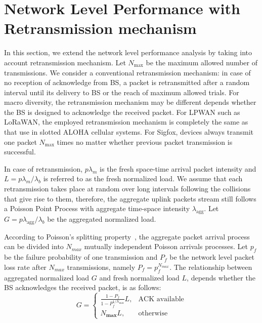\section{Network Level Performance with Retransmission mechanism}
In this section, we extend the network level performance analysis by taking into account retransmission mechanism. Let $N_{\text{max}}$ be the maximum allowed number of transmissions. We consider a conventional retransmission mechanism: in case of no reception of acknowledge from BS, a packet is retransmitted after a random interval until its delivery to BS or the reach of maximum allowed trials. For macro diversity, the retransmission mechanism may be different depends whether the BS is designed to acknowledge the received packet. For LPWAN such as LoRaWAN, the employed retransmission mechanism is completely the same as that use in slotted ALOHA cellular systems. For Sigfox, devices always transmit one packet $N_{\text{max}}$ times no matter whether previous packet transmission is successful.

In case of retransmission, $p\lambda_{m}$ is the fresh space-time arrival packet intensity and $L = p\lambda_{m}/\lambda_{b}$ is referred to as the fresh normalized load. We assume that each retransmission takes place at random over long intervals following the collisions that give rise to them, therefore, the aggregate uplink packets stream still follows a Poisson Point Process with aggregate time-space intensity $\lambda_{\text{agg}}$. Let $G = p\lambda_{\text{agg}}/\lambda_{b}$ be the aggregated normalized load. 

According to Poisson's splitting property~\cite{meyn2012markov}, the aggregate packet arrival process can be divided into $N_{max}$ mutually independent Poisson arrivals processes. Let $p_{f}$ be the failure probability of one transmission and $P_{f}$ be the network level packet loss rate after $N_{max}$ transmissions, namely $P_{f} =  p_f^{N_{max}} $. The relationship between aggregated normalized load $G$ and fresh normalized load $L$, depends whether the BS acknowledges the received packet, is as follows:
\begin{equation}
\label{eq:relationship_intensity_fresh_agg}
	G=
	\begin{cases}
	\frac{ 1-P_f }{1-P_f^{1/N_{\text{max}}}} L, & \text{ACK available} \\
	N_{\textbf{max}} L , & \text{otherwise}
	\end{cases}
\end{equation}
